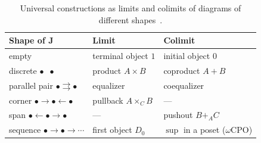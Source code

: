 \begin{table}[tb]
  \centering
  \small
  \begin{tabular}{@{}lll@{}}
    \toprule
    \textbf{Shape of $\mathbf{J}$} & \textbf{Limit} & \textbf{Colimit} \\
    \midrule
    empty & terminal object $1$ & initial object $0$ \\
    discrete $\bullet \;\; \bullet$ & product $A \times B$ & coproduct $A + B$ \\
    parallel pair $\bullet \rightrightarrows \bullet$ & equalizer & coequalizer \\
    corner $\bullet \to \bullet \leftarrow \bullet$ & pullback $A \times_C B$ & --- \\
    span $\bullet \leftarrow \bullet \to \bullet$ & --- & pushout $B +_A C$ \\
    sequence $\bullet \to \bullet \to \cdots$ & first object $D_0$ & $\sup$ in a poset ($\omega$CPO) \\
    \bottomrule
  \end{tabular}
  \caption{Universal constructions as limits and colimits of diagrams of
    different shapes~\cite{Awodey10}.}
  \label{tab:limits}
\end{table}
